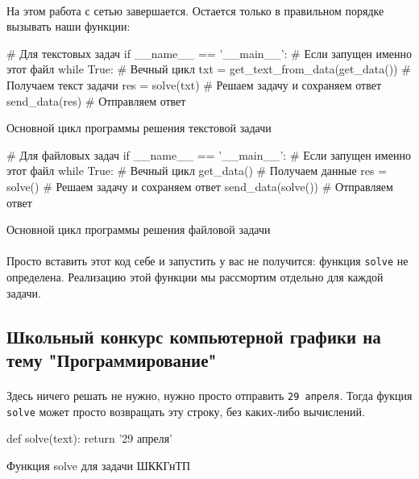 \documentclass[12pt]{article}
\begin{document}
    \paragraph{}
    На этом работа с сетью завершается.
    Остается только в правильном порядке вызывать наши функции:

    \begin{listing}[H]
        \begin{pythoncode}
# Для текстовых задач
if __name__ == '__main__':                        # Если запущен именно этот файл
    while True:                                   # Вечный цикл
        txt = get_text_from_data(get_data())      # Получаем текст задачи
        res = solve(txt)                          # Решаем задачу и сохраняем ответ
        send_data(res)                            # Отправляем ответ
        \end{pythoncode}
        \caption{Основной цикл программы решения текстовой задачи}
        \label{lst:mainloop_text}
    \end{listing}

    \begin{listing}[H]
        \begin{pythoncode}
# Для файловых задач
if __name__ == '__main__':                        # Если запущен именно этот файл
    while True:                                   # Вечный цикл
        get_data()                                # Получаем данные
        res = solve()                             # Решаем задачу и сохраняем ответ
        send_data(solve())                        # Отправляем ответ
        \end{pythoncode}
        \caption{Основной цикл программы решения файловой задачи}
        \label{lst:mainloop_file}
    \end{listing}
    \paragraph{}
    Просто вставить этот код себе и запустить у вас не получится: функция \verb|solve| не определена.
    Реализацию этой функции мы рассмортим отдельно для каждой задачи.

    \subsection{Школьный конкурс компьютерной графики на тему "Программирование"}
    \paragraph{}
    Здесь ничего решать не нужно, нужно просто отправить \verb|29 апреля|.
    Тогда фукция \verb|solve| может просто возвращать эту строку, без каких-либо вычислений.
    \begin{listing}[H]
        \begin{pythoncode}
def solve(text):
    return '29 апреля'
        \end{pythoncode}
        \caption{Функция solve для задачи ШККГнТП}
        \label{lst:solve47}
    \end{listing}
\end{document}
